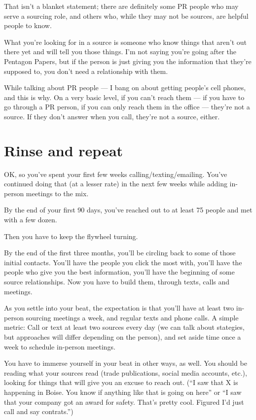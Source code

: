 \documentclass[
  12pt,
  american,
  letterpaperpaper,
  extrafontsizes,onecolumn,openright
  ]{memoir}
\begin{document}
That isn't a blanket statement; there are definitely some PR people who may serve a sourcing role, and others who, while they may not be sources, are helpful people to know.

What you're looking for in a source is someone who know things that aren't out there yet and will tell you those things. I'm not saying you're going after the Pentagon Papers, but if the person is just giving you the information that they're supposed to, you don't need a relationship with them.

While talking about PR people --- I bang on about getting people's cell phones, and this is why. On a very basic level, if you can't reach them --- if you have to go through a PR person, if you can only reach them in the office --- they're not a source. If they don't answer when you call, they're not a source, either.

\hypertarget{rinse-and-repeat}{%
\section*{Rinse and repeat}\label{rinse-and-repeat}}

OK, so you've spent your first few weeks calling/texting/emailing. You've continued doing that (at a lesser rate) in the next few weeks while adding in-person meetings to the mix.

By the end of your first 90 days, you've reached out to at least 75 people and met with a few dozen.

Then you have to keep the flywheel turning.

By the end of the first three months, you'll be circling back to some of those initial contacts. You'll have the people you click the most with, you'll have the people who give you the best information, you'll have the beginning of some source relationships. Now you have to build them, through texts, calls and meetings.

As you settle into your beat, the expectation is that you'll have at least two in-person sourcing meetings a week, and regular texts and phone calls. A simple metric: Call or text at least two sources every day (we can talk about stategies, but approaches will differ depending on the person), and set aside time once a week to schedule in-person meetings.

You have to immerse yourself in your beat in other ways, as well. You should be reading what your sources read (trade publications, social media accounts, etc.), looking for things that will give you an excuse to reach out. (\enquote{I saw that X is happening in Boise. You know if anything like that is going on here} or \enquote{I saw that your company got an award for safety. That's pretty cool. Figured I'd just call and say contrats.})
\end{document}
